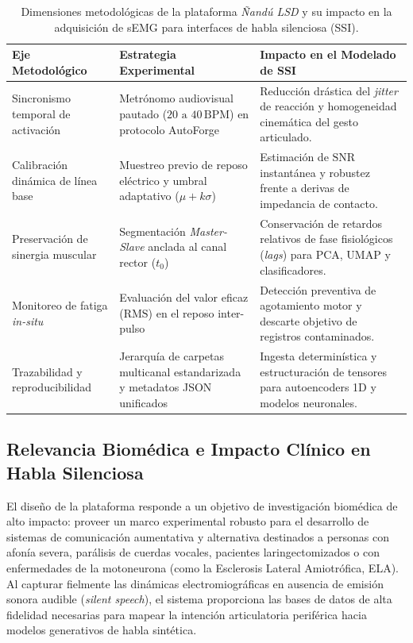 \begin{table}[htbp]
\centering
\small
\caption{Dimensiones metodológicas de la plataforma \textit{Ñandú LSD} y su impacto en la adquisición de sEMG para interfaces de habla silenciosa (SSI).}
\label{tab:dimensiones_plataforma}
\vspace{0.2cm}
\begin{tabular}{p{2.8cm} p{5.2cm} p{6.0cm}}
\toprule
\textbf{Eje Metodológico} & \textbf{Estrategia Experimental} & \textbf{Impacto en el Modelado de SSI} \\
\midrule
Sincronismo temporal de activación & Metrónomo audiovisual pautado ($20\text{ a }40\,\text{BPM}$) en protocolo AutoForge & Reducción drástica del \textit{jitter} de reacción y homogeneidad cinemática del gesto articulado. \\
\addlinespace
Calibración dinámica de línea base & Muestreo previo de reposo eléctrico y umbral adaptativo ($\mu + k\sigma$) & Estimación de $\text{SNR}$ instantánea y robustez frente a derivas de impedancia de contacto. \\
\addlinespace
Preservación de sinergia muscular & Segmentación \textit{Master-Slave} anclada al canal rector ($t_0$) & Conservación de retardos relativos de fase fisiológicos (\textit{lags}) para PCA, UMAP y clasificadores. \\
\addlinespace
Monitoreo de fatiga \textit{in-situ} & Evaluación del valor eficaz ($\text{RMS}$) en el reposo inter-pulso & Detección preventiva de agotamiento motor y descarte objetivo de registros contaminados. \\
\addlinespace
Trazabilidad y reproducibilidad & Jerarquía de carpetas multicanal estandarizada y metadatos JSON unificados & Ingesta determinística y estructuración de tensores para autoencoders 1D y modelos neuronales. \\
\bottomrule
\end{tabular}
\end{table}

\subsection{Relevancia Biomédica e Impacto Clínico en Habla Silenciosa}
\label{subsec:relevancia_biomedica}

El diseño de la plataforma responde a un objetivo de investigación biomédica de alto impacto: proveer un marco experimental robusto para el desarrollo de sistemas de comunicación aumentativa y alternativa destinados a personas con afonía severa, parálisis de cuerdas vocales, pacientes laringectomizados o con enfermedades de la motoneurona (como la Esclerosis Lateral Amiotrófica, ELA). Al capturar fielmente las dinámicas electromiográficas en ausencia de emisión sonora audible (\textit{silent speech}), el sistema proporciona las bases de datos de alta fidelidad necesarias para mapear la intención articulatoria periférica hacia modelos generativos de habla sintética.

